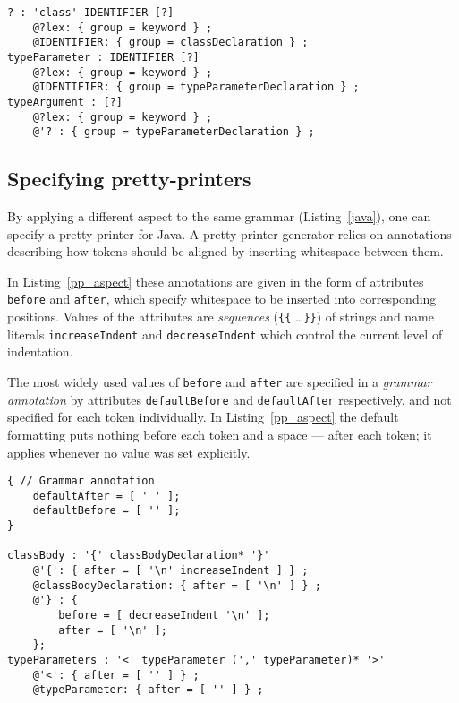 \documentclass{IOS-Book-Article}     %
\newcommand{\lstref}[1]{Listing~\ref{#1}}
\begin{document}
\begin{lstlisting}[language=Grammatic,caption=Highlighting aspect for class declarations in Java,float,label=java_aspect]
? : 'class' IDENTIFIER [?]
	@?lex: { group = keyword } ;
	@IDENTIFIER: { group = classDeclaration } ;
typeParameter : IDENTIFIER [?]
	@?lex: { group = keyword } ;
	@IDENTIFIER: { group = typeParameterDeclaration } ;
typeArgument : [?]
	@?lex: { group = keyword } ;
	@'?': { group = typeParameterDeclaration } ;
\end{lstlisting}

\subsection{Specifying pretty-printers}

By applying a different aspect to the same grammar (\lstref{java}), one can specify a pretty-printer for Java. A pretty-printer generator relies on annotations describing how tokens should be aligned by inserting whitespace between them. 

In \lstref{pp_aspect} these annotations are given in the form of attributes \texttt{before} and \texttt{after}, which specify whitespace to be inserted into corresponding positions. Values of the attributes are \emph{sequences} (\texttt{\{\{} \ldots \texttt{\}\}}) of strings and name literals \texttt{increaseIndent} and \texttt{decreaseIndent} which control the current level of indentation. 

The most widely used values of \texttt{before} and \texttt{after} are specified in a \emph{grammar annotation} by attributes \texttt{defaultBefore} and \texttt{defaultAfter} respectively, and not specified for each token individually. In \lstref{pp_aspect} the default formatting puts nothing before each token and a space --- after each token; it applies whenever no value was set explicitly.

\begin{lstlisting}[language=Grammatic,caption=Pretty-printing aspect for class declarations in Java,label=pp_aspect,float]
{ // Grammar annotation
	defaultAfter = [ ' ' ]; 
	defaultBefore = [ '' ];
} 
	
classBody : '{' classBodyDeclaration* '}'
	@'{': { after = [ '\n' increaseIndent ] } ;
	@classBodyDeclaration: { after = [ '\n' ] } ;
	@'}': {
		before = [ decreaseIndent '\n' ];
		after = [ '\n' ];
	};
typeParameters : '<' typeParameter (',' typeParameter)* '>' 
	@'<': { after = [ '' ] } ;
	@typeParameter: { after = [ '' ] } ;
\end{lstlisting}
\end{document}
